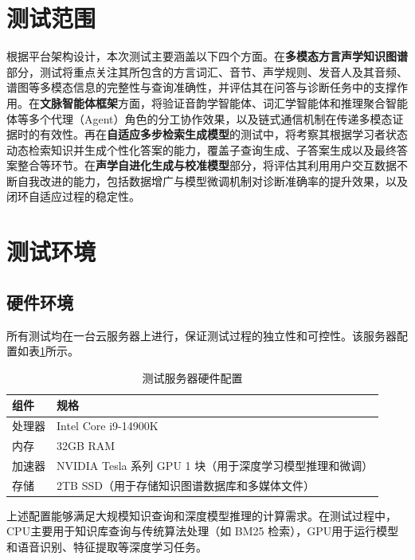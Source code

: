 \section{测试范围}
根据平台架构设计，本次测试主要涵盖以下四个方面。在\textbf{多模态方言声学知识图谱}部分，测试将重点关注其所包含的方言词汇、音节、声学规则、发音人及其音频、谱图等多模态信息的完整性与查询准确性，并评估其在问答与诊断任务中的支撑作用。在\textbf{文脉智能体框架}方面，将验证音韵学智能体、词汇学智能体和推理聚合智能体等多个代理（Agent）角色的分工协作效果，以及链式通信机制在传递多模态证据时的有效性。再在\textbf{自适应多步检索生成模型}的测试中，将考察其根据学习者状态动态检索知识并生成个性化答案的能力，覆盖子查询生成、子答案生成以及最终答案整合等环节。在\textbf{声学自进化生成与校准模型}部分，将评估其利用用户交互数据不断自我改进的能力，包括数据增广与模型微调机制对诊断准确率的提升效果，以及闭环自适应过程的稳定性。


\section{测试环境}
\subsection{硬件环境}
所有测试均在一台云服务器上进行，保证测试过程的独立性和可控性。该服务器配置如表\ref{tab:配置}所示。
\begin{table}[H]\centering
\caption{测试服务器硬件配置}
\label{tab:配置} %
\begin{tabular}{ll}
\toprule[1pt]
\textbf{组件} & \textbf{规格} \\
\midrule[0.5pt]
处理器 & Intel Core i9-14900K \\
内存   & 32GB RAM \\
加速器 & NVIDIA Tesla 系列 GPU 1 块（用于深度学习模型推理和微调） \\
存储   & 2TB SSD（用于存储知识图谱数据库和多媒体文件） \\
\bottomrule[1pt]
\end{tabular}
\end{table}

上述配置能够满足大规模知识查询和深度模型推理的计算需求。在测试过程中，CPU主要用于知识库查询与传统算法处理（如 BM25 检索），GPU用于运行模型和语音识别、特征提取等深度学习任务。

